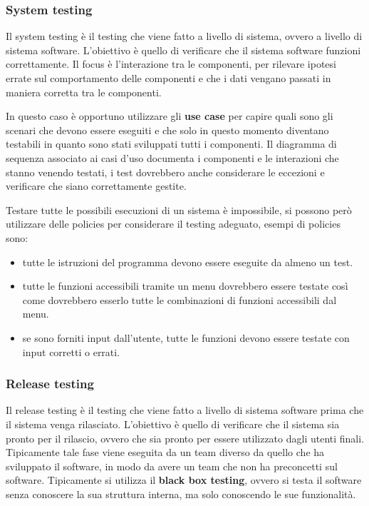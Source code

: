 \subsubsection{System testing}
Il system testing è il testing che viene fatto a livello di sistema, ovvero a livello
di sistema software. L'obiettivo è quello di verificare che il sistema software
funzioni correttamente. Il focus è l'interazione tra le componenti, per rilevare 
ipotesi errate sul comportamento delle componenti e che i dati vengano passati
in maniera corretta tra le componenti.

In questo caso è opportuno utilizzare gli \textbf{use case} per capire quali sono
gli scenari che devono essere eseguiti e che solo in questo momento diventano 
testabili in quanto sono stati sviluppati tutti i componenti.
Il diagramma di sequenza associato ai casi d’uso documenta i componenti e
le interazioni che stanno venendo testati, i test dovrebbero anche considerare
le eccezioni e verificare che siano correttamente gestite.

Testare tutte le possibili esecuzioni di un sistema è impossibile,
si possono però utilizzare delle policies per considerare il testing adeguato,
esempi di policies sono:
\begin{itemize}
    \item tutte le istruzioni del programma
    devono essere eseguite da almeno un test.
    \item tutte le funzioni accessibili tramite un menu dovrebbero
    essere testate così come dovrebbero esserlo tutte le combinazioni di
    funzioni accessibili dal menu.
    \item se sono forniti input dall’utente, tutte le funzioni devono essere
    testate con input corretti o errati.
\end{itemize}
\subsubsection{Release testing}
Il release testing è il testing che viene fatto a livello di sistema software
prima che il sistema venga rilasciato. L'obiettivo è quello di verificare che
il sistema sia pronto per il rilascio, ovvero che sia pronto per essere utilizzato
dagli utenti finali. 
Tipicamente tale fase viene eseguita da un team diverso da quello che ha sviluppato
il software, in modo da avere un team che non ha preconcetti sul software.
Tipicamente si utilizza il \textbf{black box testing}, ovvero si testa il software
senza conoscere la sua struttura interna, ma solo conoscendo le sue funzionalità.

